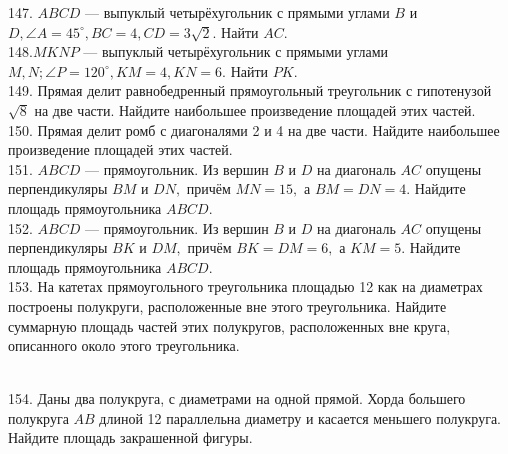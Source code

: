 \documentclass[12pt]{article}
\begin{document}
147. $ABCD$ --- выпуклый четырёхугольник с прямыми углами $B$ и $D,\angle A=45^\circ, BC=4, CD=3\sqrt{2}.$ Найти $AC.$\\
148.$MKNP$ --- выпуклый четырёхугольник с прямыми углами $M, N; \angle P=120^\circ, KM=4, KN=6.$ Найти $PK.$\\
149. Прямая делит равнобедренный прямоугольный треугольник с гипотенузой $\sqrt{8}$ на две части. Найдите наибольшее произведение площадей этих частей.\\
150. Прямая делит ромб с диагоналями 2 и 4 на две части. Найдите наибольшее произведение площадей
этих частей.\\
151. $ABCD$ --- прямоугольник. Из вершин $B$ и $D$ на диагональ $AC$ опущены перпендикуляры $BM$ и $DN,$
причём $MN=15,$ а $BM=DN=4.$ Найдите площадь прямоугольника $ABCD.$\\
152. $ABCD$ --- прямоугольник. Из вершин $B$ и $D$ на диагональ $AC$ опущены перпендикуляры $BK$ и $DM,$ причём $BK=DM=6,$ а $KM=5.$ Найдите площадь прямоугольника $ABCD.$\\
153. На катетах прямоугольного треугольника площадью 12 как на диаметрах построены полукруги, расположенные вне этого треугольника. Найдите суммарную площадь частей этих полукругов, расположенных вне круга, описанного около этого треугольника.
\begin{figure}[h]
\end{figure}\\
154. Даны два полукруга, с диаметрами на одной прямой.
Хорда большего полукруга $AB$ длиной 12 параллельна диаметру и касается
меньшего полукруга. Найдите площадь закрашенной фигуры.
\begin{figure}[h]
\end{figure}\\
\end{document}
